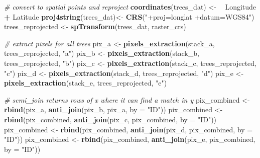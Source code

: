 \documentclass[12pt,twoside]{reedthesis}
\newenvironment{Shaded}{\begin{snugshade}}{\end{snugshade}}
\newcommand{\CommentTok}[1]{\textcolor[rgb]{0.56,0.35,0.01}{\textit{#1}}}
\newcommand{\DataTypeTok}[1]{\textcolor[rgb]{0.13,0.29,0.53}{#1}}
\newcommand{\ErrorTok}[1]{\textcolor[rgb]{0.64,0.00,0.00}{\textbf{#1}}}
\newcommand{\KeywordTok}[1]{\textcolor[rgb]{0.13,0.29,0.53}{\textbf{#1}}}
\newcommand{\NormalTok}[1]{#1}
\newcommand{\OperatorTok}[1]{\textcolor[rgb]{0.81,0.36,0.00}{\textbf{#1}}}
\newcommand{\StringTok}[1]{\textcolor[rgb]{0.31,0.60,0.02}{#1}}
\begin{document}
\begin{Shaded}
\begin{Highlighting}[]
{{{{{\CommentTok{# convert to spatial points and reproject}
\KeywordTok{coordinates}\NormalTok{(trees_dat) <-}\StringTok{ }\ErrorTok{~}\StringTok{ }\NormalTok{Longitude }\OperatorTok{+}\StringTok{ }\NormalTok{Latitude}
\KeywordTok{proj4string}\NormalTok{(trees_dat)<-}\StringTok{ }\KeywordTok{CRS}\NormalTok{(}\StringTok{"+proj=longlat +datum=WGS84"}\NormalTok{)}
\NormalTok{trees_reprojected <-}\StringTok{ }\KeywordTok{spTransform}\NormalTok{(trees_dat, raster_crs)}

\CommentTok{# extract pixels for all trees}
\NormalTok{pix_a <-}\StringTok{ }\KeywordTok{pixels_extraction}\NormalTok{(stack_a, trees_reprojected, }\StringTok{"a"}\NormalTok{)}
\NormalTok{pix_b <-}\StringTok{ }\KeywordTok{pixels_extraction}\NormalTok{(stack_b, trees_reprojected, }\StringTok{"b"}\NormalTok{)}
\NormalTok{pix_c <-}\StringTok{ }\KeywordTok{pixels_extraction}\NormalTok{(stack_c, trees_reprojected, }\StringTok{"c"}\NormalTok{)}
\NormalTok{pix_d <-}\StringTok{ }\KeywordTok{pixels_extraction}\NormalTok{(stack_d, trees_reprojected, }\StringTok{"d"}\NormalTok{)}
\NormalTok{pix_e <-}\StringTok{ }\KeywordTok{pixels_extraction}\NormalTok{(stack_e, trees_reprojected, }\StringTok{"e"}\NormalTok{)}

\CommentTok{# semi_join returns rows of x where it can find a match in y}
\NormalTok{pix_combined <-}\StringTok{ }\KeywordTok{rbind}\NormalTok{(pix_a, }\KeywordTok{anti_join}\NormalTok{(pix_b, pix_a, }\DataTypeTok{by =} \StringTok{"ID"}\NormalTok{))}
\NormalTok{pix_combined <-}\StringTok{ }\KeywordTok{rbind}\NormalTok{(pix_combined, }\KeywordTok{anti_join}\NormalTok{(pix_c, pix_combined, }\DataTypeTok{by =} \StringTok{"ID"}\NormalTok{))}
\NormalTok{pix_combined <-}\StringTok{ }\KeywordTok{rbind}\NormalTok{(pix_combined, }\KeywordTok{anti_join}\NormalTok{(pix_d, pix_combined, }\DataTypeTok{by =} \StringTok{"ID"}\NormalTok{))}
\NormalTok{pix_combined <-}\StringTok{ }\KeywordTok{rbind}\NormalTok{(pix_combined, }\KeywordTok{anti_join}\NormalTok{(pix_e, pix_combined, }\DataTypeTok{by =} \StringTok{"ID"}\NormalTok{))}

}}}}}
\end{Highlighting}
\end{Shaded}
\end{document}
